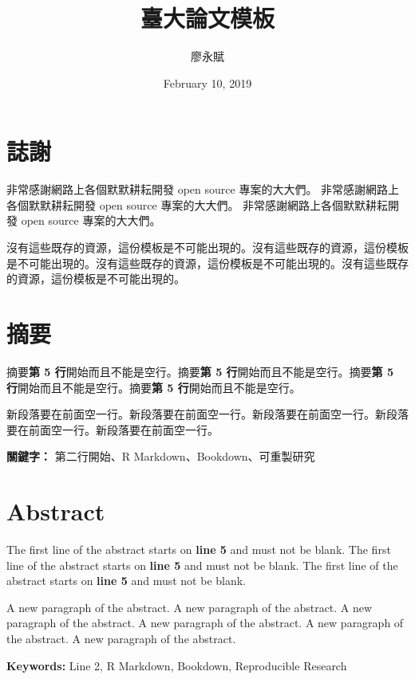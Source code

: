 \documentclass[oneside]{book}
\title{臺大論文模板}
\author{廖永賦}
\date{February 10, 2019}
\theoremstyle{definition}
\theoremstyle{definition}
\theoremstyle{definition}
\theoremstyle{remark}
\begin{document}


\clearpage
{}

{}



\chapter*{誌謝}
非常感謝網路上各個默默耕耘開發 open source 專案的大大們。
非常感謝網路上各個默默耕耘開發 open source 專案的大大們。
非常感謝網路上各個默默耕耘開發 open source 專案的大大們。

沒有這些既存的資源，這份模板是不可能出現的。沒有這些既存的資源，這份模板是不可能出現的。沒有這些既存的資源，這份模板是不可能出現的。沒有這些既存的資源，這份模板是不可能出現的。


\chapter*{摘要}
摘要\textbf{第 5 行}開始而且不能是空行。摘要\textbf{第 5 行}開始而且不能是空行。摘要\textbf{第 5 行}開始而且不能是空行。摘要\textbf{第 5 行}開始而且不能是空行。

新段落要在前面空一行。新段落要在前面空一行。新段落要在前面空一行。新段落要在前面空一行。新段落要在前面空一行。
\bigbreak

\noindent
\textbf{關鍵字：} 第二行開始、R Markdown、Bookdown、可重製研究

\chapter*{Abstract}
The first line of the abstract starts on \textbf{line 5} and must not be blank. The first line of the abstract starts on \textbf{line 5} and must not be blank. The first line of the abstract starts on \textbf{line 5} and must not be blank.

A new paragraph of the abstract. A new paragraph of the abstract. A new paragraph of the abstract. A new paragraph of the abstract. A new paragraph of the abstract. A new paragraph of the abstract.
\bigbreak

\noindent
\textbf{Keywords:} Line 2, R Markdown, Bookdown, Reproducible Research
\end{document}
